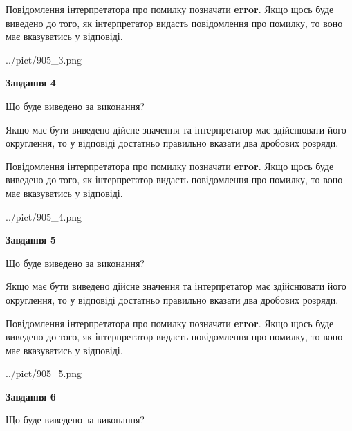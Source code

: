 \documentclass[12pt, ukrainian]{article}
\begin{document}
{\begin {Large}
Повідомлення інтерпретатора про помилку позначати \textbf{error}.
Якщо щось буде виведено до того, як інтерпретатор видасть повідомлення про помилку, 
то воно має вказуватись у відповіді. \par

\begin{center}
	{../pict/905_3.png}
\end{center}
\newpage

{\begin {center}\textbf{Завдання 4}\end {center}}\par
Що буде виведено за виконання? \par

Якщо має бути виведено дійсне значення та інтерпретатор має здійснювати його округлення, 
то у відповіді достатньо правильно вказати два дробових розряди.

Повідомлення інтерпретатора про помилку позначати \textbf{error}.
Якщо щось буде виведено до того, як інтерпретатор видасть повідомлення про помилку, 
то воно має вказуватись у відповіді. \par

\begin{center}
	{../pict/905_4.png}
\end{center}
\newpage

{\begin {center}\textbf{Завдання 5}\end {center}}\par
Що буде виведено за виконання? \par

Якщо має бути виведено дійсне значення та інтерпретатор має здійснювати його округлення, 
то у відповіді достатньо правильно вказати два дробових розряди.

Повідомлення інтерпретатора про помилку позначати \textbf{error}.
Якщо щось буде виведено до того, як інтерпретатор видасть повідомлення про помилку, 
то воно має вказуватись у відповіді. \par

\begin{center}
	{../pict/905_5.png}
\end{center}
\newpage

{\begin {center}\textbf{Завдання 6}\end {center}}\par
Що буде виведено за виконання? \par


\end{Large}}
\end{document}
